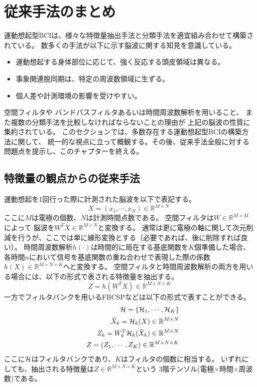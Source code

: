 \section{従来手法のまとめ}
運動想起型BCIは、様々な特徴量抽出手法と分類手法を適宜組み合わせて構築されている。
数多くの手法が以下に示す脳波に関する知見を意識している。
\begin{itemize}
    \item 運動想起する身体部位に応じて、強く反応する頭皮領域は異なる。
    \item 事象関連脱同期は、特定の周波数領域に生ずる。
    \item 個人差や計測環境の影響を受けやすい。
\end{itemize}
空間フィルタや
バンドパスフィルタあるいは時間周波数解析を用いること、
また複数の分類手法を比較しなければならないことの理由が
上記の脳波の性質に集約されている。
このセクションでは、多数存在する運動想起型BCIの構築方法に関して、
統一的な視点に立って概観する。その後、従来手法全般に対する問題点を提示し、このチャプターを終える。

\subsection{特徴量の観点からの従来手法}
運動想起を1回行った際に計測された脳波を以下で表記する。
\begin{equation}
    X =(x_1, \cdots, x_N)\in \mathbb{R}^{M \times N}\    
\end{equation}
ここに\(M\)は電極の個数、\(N\)は計測時間点数である。
空間フィルタは\(W\in \mathbb R^{M \times M}\)によって
脳波を\(W^TX \in \mathbb R^{M \times N}\)と変換する。
通常は更に電極の軸に関して次元削減を行うが、ここでは単に線形変換とする（必要であれば、後に削除すれば良い）。
時間周波数解析\(h(\cdot)\)は時間的に局在する基底関数を\(K\)個準備した場合、
各時間\(n\)において信号を基底関数の重ね合わせで表現した際の係数\(h(X) \in \mathbb R^{M \times N \times K}\)へと変換する。
空間フィルタと時間周波数解析の両方を用いる場合には、以下の形式で表される特徴量を抽出する。
\begin{equation}
    Z = h(W^TX) \in \mathbb R^{M\times N \times K}
    \label{eq:EEGfeatures}
\end{equation} 
一方でフィルタバンクを用いるFBCSPなどは以下の形式で表すことができる。
\begin{eqnarray}
    && {\cal H}  =  \{ {\cal H}_1,\cdots, {\cal H}_K \} \\
    && \hat X_k  = {\cal H}_k(X) \in \mathbb R^{M\times N} \\
    && Z_k  = W_k^T{\cal H}_k(\hat X_k) \in \mathbb R^{M\times N} \\
    && Z  =  (Z_1,\cdots, Z_K) \in \mathbb R^{M\times N \times K}
    \label{eq:EEGfeaturesbandpass}
\end{eqnarray} 
ここに\({\cal H}\)はフィルタバンクであり、\(K\)はフィルタの個数に相当する。
いずれにしても、抽出される特徴量は\(Z\in \mathbb R^{M\times N \times K}\)という
3階テンソル(電極×時間×周波数)である。

